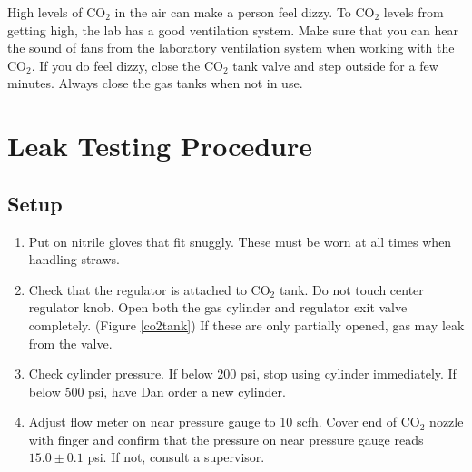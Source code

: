 \documentclass[A4,12pt]{article}
\begin{document}
High levels of CO$_2$ in the air can make a person feel dizzy. To CO$_2$ levels from getting high, the lab has a good ventilation system. Make sure that you can hear the sound of fans from the laboratory ventilation system when working with the CO$_2$. If you do feel dizzy, close the CO$_2$ tank valve and step outside for a few minutes. Always close the gas tanks when not in use.



\newpage

\section{Leak Testing Procedure}

\subsection{Setup}
\begin{enumerate}
	\item Put on nitrile gloves that fit snuggly. These must be worn at all times when handling straws.
	\item Check that the regulator is attached to CO$_2$ tank. Do not touch center regulator knob. Open both the gas cylinder and regulator exit valve completely. (Figure \ref{co2tank}) If these are only partially opened, gas may leak from the valve.   
	\item Check cylinder pressure. If below 200 psi, stop using cylinder immediately. If below 500 psi, have Dan order a new cylinder.
	\item Adjust flow meter on near pressure gauge to 10 scfh. Cover end of CO$_2$ nozzle with finger and confirm that the pressure on near pressure gauge reads $15.0 \pm 0.1$ psi. If not, consult a supervisor.
\end{enumerate}
\end{document}
